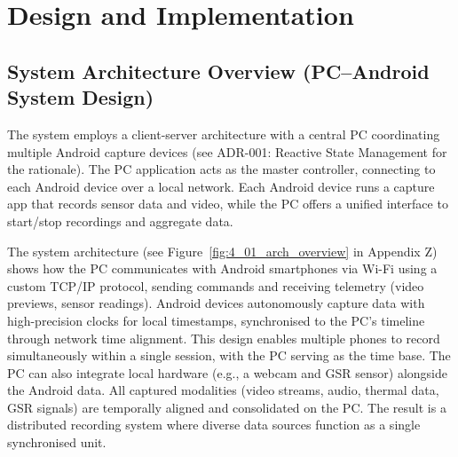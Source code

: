 \chapter{Design and Implementation}\label{chap:design-implementation}


\section{System Architecture Overview (PC--Android System Design)}\label{sec:4-1}
The system employs a client-server architecture with a central PC coordinating multiple Android capture devices (see ADR-001: Reactive State Management for the rationale). The PC application acts as the master controller, connecting to each Android device over a local network. Each Android device runs a capture app that records sensor data and video, while the PC offers a unified interface to start/stop recordings and aggregate data.

The system architecture (see Figure~\ref{fig:4_01_arch_overview} in Appendix Z) shows how the PC communicates with Android smartphones via Wi-Fi using a custom TCP/IP protocol, sending commands and receiving telemetry (video previews, sensor readings). Android devices autonomously capture data with high-precision clocks for local timestamps, synchronised to the PC's timeline through network time alignment. This design enables multiple phones to record simultaneously within a single session, with the PC serving as the time base. The PC can also integrate local hardware (e.g., a webcam and GSR sensor) alongside the Android data. All captured modalities (video streams, audio, thermal data, GSR signals) are temporally aligned and consolidated on the PC. The result is a distributed recording system where diverse data sources function as a single synchronised unit.


